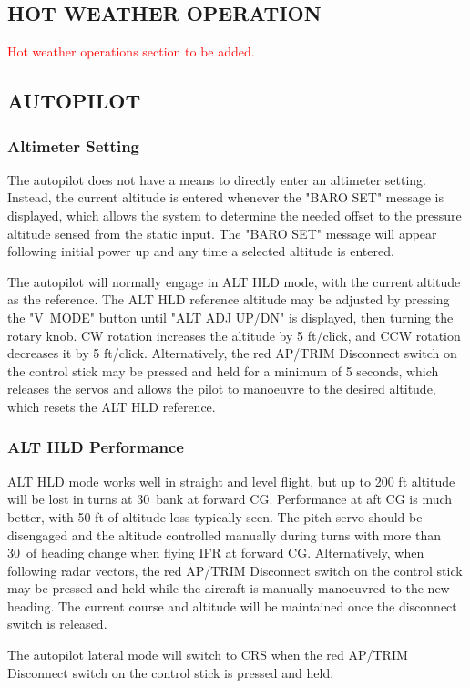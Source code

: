 \subsection{HOT WEATHER OPERATION}
\textcolor{red}{Hot weather operations section to be added.}

\subsection{AUTOPILOT}
\subsubsection{Altimeter Setting} The autopilot does not have a means to directly enter an altimeter setting. Instead, the current altitude is entered whenever the "BARO SET" message is displayed, which allows the system to determine the needed offset to the pressure altitude sensed from the static input. The "BARO SET" message will appear following initial power up and any time a selected altitude is entered.

The autopilot will normally engage in ALT HLD mode, with the current altitude as the reference. The ALT HLD reference altitude may be adjusted by pressing the "V~MODE" button until "ALT ADJ UP/DN" is displayed, then turning the rotary knob. CW rotation increases the altitude by 5 ft/click, and CCW rotation decreases it by 5 ft/click. Alternatively, the red AP/TRIM Disconnect switch on the control stick may be pressed and held for a minimum of 5 seconds, which releases the servos and allows the pilot to manoeuvre to the desired altitude, which resets the ALT HLD reference.

\subsubsection{ALT HLD Performance} ALT HLD mode works well in straight and level flight, but up to 200 ft altitude will be lost in turns at 30\textdegree \ bank at forward CG. Performance at aft CG is much better, with 50 ft of altitude loss typically seen. The pitch servo should be disengaged and the altitude controlled manually during turns with more than 30\textdegree \ of heading change when flying IFR at forward CG. Alternatively, when following radar vectors, the red AP/TRIM Disconnect switch on the control stick may be pressed and held while the aircraft is manually manoeuvred to the new heading.  The current course and altitude will be maintained once the disconnect switch is released.

\begin{Note}
  The autopilot lateral mode will switch to CRS when the red AP/TRIM Disconnect switch on the control stick is pressed and held.
\end{Note}
\cleardoublepage
